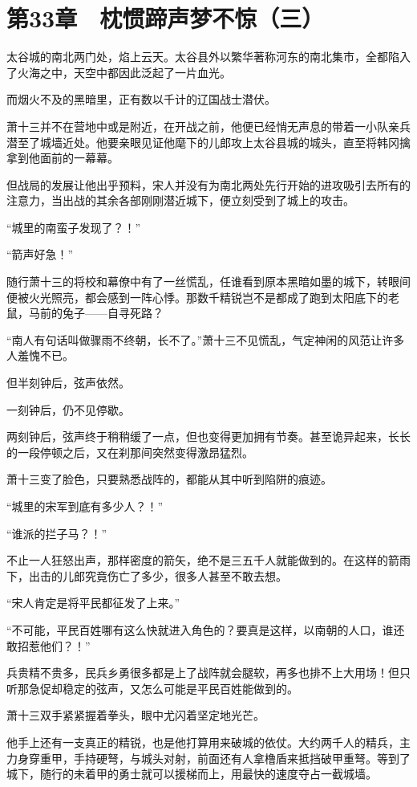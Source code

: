\section{第33章　枕惯蹄声梦不惊（三）}

太谷城的南北两门处，焰上云天。太谷县外以繁华著称河东的南北集市，全都陷入了火海之中，天空中都因此泛起了一片血光。

而烟火不及的黑暗里，正有数以千计的辽国战士潜伏。

萧十三并不在营地中或是附近，在开战之前，他便已经悄无声息的带着一小队亲兵潜至了城墙近处。他要亲眼见证他麾下的儿郎攻上太谷县城的城头，直至将韩冈擒拿到他面前的一幕幕。

但战局的发展让他出乎预料，宋人并没有为南北两处先行开始的进攻吸引去所有的注意力，当出战的其余各部刚刚潜近城下，便立刻受到了城上的攻击。

“城里的南蛮子发现了？！”

“箭声好急！”

随行萧十三的将校和幕僚中有了一丝慌乱，任谁看到原本黑暗如墨的城下，转眼间便被火光照亮，都会感到一阵心悸。那数千精锐岂不是都成了跑到太阳底下的老鼠，马前的兔子——自寻死路？

“南人有句话叫做骤雨不终朝，长不了。”萧十三不见慌乱，气定神闲的风范让许多人羞愧不已。

但半刻钟后，弦声依然。

一刻钟后，仍不见停歇。

两刻钟后，弦声终于稍稍缓了一点，但也变得更加拥有节奏。甚至诡异起来，长长的一段停顿之后，又在刹那间突然变得激昂猛烈。

萧十三变了脸色，只要熟悉战阵的，都能从其中听到陷阱的痕迹。

“城里的宋军到底有多少人？！”

“谁派的拦子马？！”

不止一人狂怒出声，那样密度的箭矢，绝不是三五千人就能做到的。在这样的箭雨下，出击的儿郎究竟伤亡了多少，很多人甚至不敢去想。

“宋人肯定是将平民都征发了上来。”

“不可能，平民百姓哪有这么快就进入角色的？要真是这样，以南朝的人口，谁还敢招惹他们？！”

兵贵精不贵多，民兵乡勇很多都是上了战阵就会腿软，再多也排不上大用场！但只听那急促却稳定的弦声，又怎么可能是平民百姓能做到的。

萧十三双手紧紧握着拳头，眼中尤闪着坚定地光芒。

他手上还有一支真正的精锐，也是他打算用来破城的依仗。大约两千人的精兵，主力身穿重甲，手持硬弩，与城头对射，前面还有人拿橹盾来抵挡破甲重弩。等到了城下，随行的未着甲的勇士就可以援梯而上，用最快的速度夺占一截城墙。

